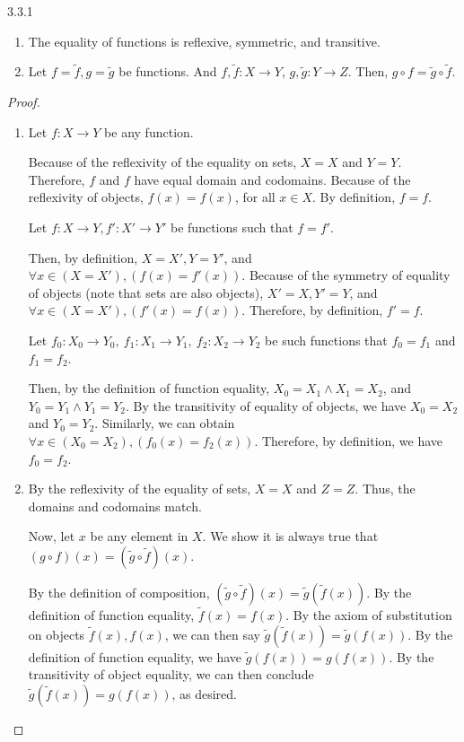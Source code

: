 \begin{exercise}{3.3.1}
	\begin{enumerate}
		\item The equality of functions is reflexive, symmetric, and transitive.
		\item Let $f = \tilde{f}, g = \tilde{g}$ be functions. And $f,\tilde{f}: X \to Y$, $g,\tilde{g}: Y \to Z$. Then, $g \circ f = \tilde{g} \circ \tilde{f}$.
	\end{enumerate}
\end{exercise}
\begin{proof}\leavevmode
	\begin{enumerate}
		\item 
			 Let $f: X \to Y$ be any function. 
			
			Because of the reflexivity of the equality on sets, $X = X$ and $Y = Y$. Therefore, $f$ and $f$ have equal domain and codomains. Because of the reflexivity of objects, $f(x) = f(x)$, for all $x \in X$. By definition, $f = f$.
			
			 Let $f: X \to Y,f': X' \to Y'$ be functions such that $f = f'$. 
			
			Then, by definition, $X = X', Y = Y'$, and $\forall x \in (X=X'), (f(x) = f'(x))$. Because of the symmetry of equality of objects (note that sets are also objects), $X' = X, Y' = Y$, and $\forall x \in (X=X'), (f'(x) = f(x))$. Therefore, by definition, $f' = f$.
			
			 Let $f_0: X_0\to Y_0,\ f_1:X_1\to Y_1,\ f_2:X_2\to Y_2$ be such functions that $f_0 = f_1$ and $f_1 = f_2$.
			
			Then, by the definition of function equality, $X_0 = X_1 \wedge X_1 = X_2$, and $Y_0 = Y_1 \wedge Y_1 = Y_2$. By the transitivity of equality of objects, we have $X_0 = X_2$ and $Y_0 = Y_2$. Similarly, we can obtain $\forall x \in (X_0 = X_2), (f_0(x) = f_2(x))$. Therefore, by definition, we have $f_0 = f_2$.
		
		\item 
			By the reflexivity of the equality of sets, $X = X$ and $Z = Z$. Thus, the domains and codomains match.
			
			Now, let $x$ be any element in $X$. We show it is always true that $(g \circ f)(x) = (\tilde{g} \circ \tilde{f})(x)$.
			
			By the definition of composition, $(\tilde{g} \circ \tilde{f})(x) = \tilde{g}(\tilde{f}(x))$. By the definition of function equality, $\tilde{f}(x) = f(x)$. By the axiom of substitution on objects $\tilde{f}(x),f(x)$, we can then say $\tilde{g}(\tilde{f}(x)) = \tilde{g}(f(x))$. By the definition of function equality, we have $\tilde{g}(f(x)) = g(f(x))$. By the transitivity of object equality, we can then conclude $\tilde{g}(\tilde{f}(x)) = g(f(x))$, as desired.
	\end{enumerate}
\end{proof}


